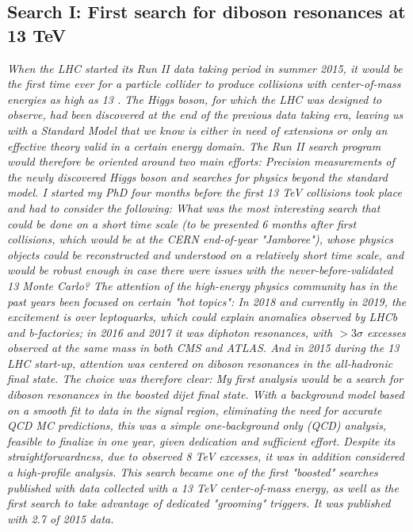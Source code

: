 \begin{centering}
\chapter{Search I: First search for diboson resonances at 13 TeV}
\label{searchI}
\textit{
\noindent When the LHC started its Run II data taking period in summer 2015, it would be the first time ever for a particle collider to produce collisions with center-of-mass energies as high as 13 \TeV. The Higgs boson, for which the LHC was designed to observe, had been discovered at the end of the previous data taking era, leaving us with a Standard Model that we know is either in need of extensions or only an effective theory valid in a certain energy domain. The Run II search program would therefore be oriented around two main efforts: Precision measurements of the newly discovered Higgs boson and searches for physics beyond the standard model.
\newline
\newline
I started my PhD four months before the first 13 TeV collisions took place and had to consider the following:
What was the most interesting search that could be done on a short time scale (to be presented 6 months after first collisions, which would be at the CERN end-of-year "Jamboree"), whose physics objects could be reconstructed and understood on a relatively short time scale, and would be robust enough in case there were issues with the never-before-validated 13 \TeV Monte Carlo?
\newline
\newline
The attention of the high-energy physics community has in the past years been focused on certain "hot topics": In 2018 and currently in 2019, the excitement is over leptoquarks, which could explain anomalies observed by LHCb and b-factories; in 2016 and 2017 it was diphoton resonances, with $>3 \sigma$ excesses observed at the same mass in both CMS and ATLAS. And in 2015 during the 13 \TeV LHC start-up, attention was centered on diboson resonances in the all-hadronic final state. The choice was therefore clear: My first analysis would be a search for diboson resonances in the boosted dijet final state. With a background model based on a smooth fit to data in the signal region, eliminating the need for accurate QCD MC predictions, this was a simple one-background only (QCD) analysis, feasible to finalize in one year, given dedication and sufficient effort. Despite its straightforwardness, due to observed 8 TeV excesses, it was in addition considered a high-profile analysis.
\newline
\newline
This search became one of the first "boosted" searches published with data collected with a 13 TeV center-of-mass energy, as well as the first search to take advantage of dedicated "grooming" triggers. It was published with 2.7 \fbinv of 2015 data.
}
\end{centering}
